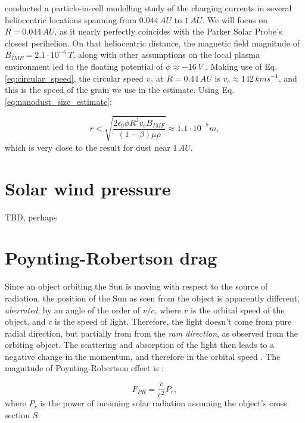 \citeauthor{guillemant2013simulation} conducted a particle-in-cell modelling study of the charging currents in several heliocentric locations \citep{guillemant2013simulation} spanning from $0.044 \, \si{AU}$ to $1 \, \si{AU}$. We will focus on $R = 0.044 \, \si{AU}$, as it nearly perfectly coincides with the Parker Solar Probe's closest perihelion. On that heliocentric distance, the magnetic field magnitude of $B_{IMF} = 2.1 \cdot 10^{-6} \, \si{T}$, along with other assumptions on the local plasma environment led to the floating potential of $\phi \approx -16 \, \si{V}$ \citep{guillemant2013simulation}. Making use of Eq. \ref{eq:circular_speed}, the circular speed $v_c$ at $R = 0.44 \, \si{AU}$ is $v_c \approx 142 \, \si{km s^{-1}}$, and this is the speed of the grain we use in the estimate. Using Eq. \ref{eq:nanodust_size_estimate}:

\begin{equation}
    r < \sqrt{\frac{2 \epsilon_0 \phi R^2 v_{c} B_{IMF}}{(1-\beta) \mu \rho}} \approx 
    1.1 \cdot 10^{-7} \si{m},
\end{equation}
which is very close to the result for dust near $1 \, \si{AU}$.

\section{Solar wind pressure}

TBD, perhaps

\section{Poynting-Robertson drag}

Since an object orbiting the Sun is moving with respect to the source of radiation, the position of the Sun as seen from the object is apparently different, \textit{aberrated}, by an angle of the order of $v/c$, where $v$ is the orbital speed of the object, and $c$ is the speed of light. Therefore, the light doesn't come from pure radial direction, but partially from from the \textit{ram direction}, as observed from the orbiting object. The scattering and absorption of the light then leads to a negative change in the momentum, and therefore in the orbital speed \citep{poynting1903radiation}. The magnitude of Poynting-Robertson effect is \citep{robertson1937dynamical}:

\begin{equation}
    F_{PR} = \frac{v}{c^2} P_{r},
    \label{eq:poynting_robertson}
\end{equation}
where $P_r$ is the power of incoming solar radiation assuming the object's cross section $S$: 


